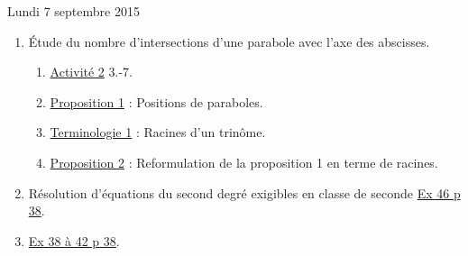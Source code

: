 \documentclass[a4paper,11pt]{article}
\theoremstyle{break}
\begin{document}
  Lundi 7 septembre 2015
  \begin{enumerate}
    
    \item \'Etude du nombre d'intersections d'une parabole avec l'axe des abscisses.
    \begin{enumerate}
      \item 
      \href{https://github.com/mathlorgues/math1sd1516/blob/master/20150907/activite.pdf}
   {Activité 2} 3.-7.
      \item 
      \href{https://github.com/mathlorgues/math1sd1516/blob/master/20150907/propositions.pdf}
   {Proposition 1} : Positions de paraboles.
      \item 
      \href{https://github.com/mathlorgues/math1sd1516/blob/master/20150907/definitions.pdf}
   {Terminologie 1} : Racines d'un trinôme.
      \item 
      \href{https://github.com/mathlorgues/math1sd1516/blob/master/20150907/propositions.pdf}
   {Proposition 2} : Reformulation de la proposition 1 en terme de racines.
    \end{enumerate}
    \item Résolution d'équations du second degré exigibles en classe de seconde 
    \href{https://github.com/mathlorgues/math1sd1516/blob/master/20150907/46p38.jpg}
   {Ex 46 p 38}.
    \item 
    \href{https://github.com/mathlorgues/math1sd1516/blob/master/20150907/38-42p38.jpg}
   {Ex 38 à 42 p 38}.
    
  \end{enumerate}
  
\end{document}
